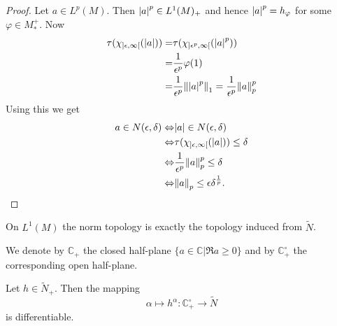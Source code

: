 \begin{proof}
    Let $a\in L^p(M)$. Then $\abs{a}^p\in L^1(M)_+$ and hence $\abs{a}^p=h_\varphi$ for some $\varphi\in M_*^+$. Now 
    \[
        \begin{split}
            \tau(\chi_{]\epsilon,\infty[}(\abs{a}))=&\tau(\chi_{]\epsilon^p,\infty[}(\abs{a}^p))\\
            =&\frac{1}{\epsilon^p}\varphi(1)\\
            =&\frac{1}{\epsilon^p}\norm{\abs{a}^p}_1=\frac{1}{\epsilon^p}\norm{a}_p^p
        \end{split}
    \]
Using this we get 
\[
    \begin{split}
        a\in N(\epsilon,\delta)\Leftrightarrow& \abs{a}\in N(\epsilon,\delta)\\
        \Leftrightarrow& \tau(\chi_{]\epsilon,\infty[}(\abs{a}))\leq \delta\\
        \Leftrightarrow& \frac{1}{\epsilon^p}\norm{a}_p^p\leq \delta\\
        \Leftrightarrow& \norm{a}_p\leq \epsilon\delta^\frac{1}{p}.
    \end{split}
\]
\end{proof}
\begin{corollary}\label{Chap2: Coro: 17}
    On $L^1(M)$ the norm topology is exactly the topology induced from $\tilde{N}$.
\end{corollary}
We denote by $\mathbb{C}_+$ the closed half-plane $\{a\in \mathbb{C}|\Re a\geq 0\}$ and by $\mathbb{C}^{\circ}_+$ the corresponding open half-plane.
\begin{lemma}  
    Let $h\in \tilde{N}_+$. Then the mapping 
    \[
        \alpha\mapsto h^\alpha:\mathbb{C}_+^\circ\to \tilde{N}
    \]
    is differentiable. 
\end{lemma}
